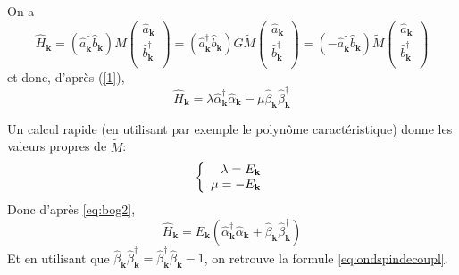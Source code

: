 \documentclass[a4paper, french]{report}
\newcommand{\an}{\hat{a}}
\newcommand{\cre}{\hat{a}^\dagger}
\newcommand{\h}{\ensuremath{\hat{H}}\xspace}
\newcommand{\ban}{\hat{b}}
\newcommand{\bcre}{\hat{b}^\dagger}
\newcommand{\ond}{\ensuremath{\mathbf{k}\xspace}}
\newcommand{\alcre}{\hat{\alpha}^\dagger_{\ond}}
\newcommand{\alan}{\hat{\alpha}_{\ond}}
\newcommand{\betcre}{\hat{\beta}^\dagger_{\ond}}
\newcommand{\betan}{\hat{\beta}_{\ond}}
\newcommand{\1}{\ensuremath{\ket{\om_1\bom_1}}\xspace}
\newcommand{\2}{\ensuremath{\ket{\om_2\bom_2}}\xspace}
\newcommand{\tilm}{\ensuremath{\tilde{M}}\xspace}
\begin{document}
On a
\[
	\h_\ond = \left(\cre_\ond \ban_\ond \right)M
	\begin{pmatrix}
	\an_\ond \\
	\bcre_\ond \\
	\end{pmatrix}
	=
	\left(\cre_\ond \ban_\ond \right)G \tilm
	\begin{pmatrix}
	\an_\ond \\
	\bcre_\ond \\
	\end{pmatrix}
	=
	\left(-\cre_\ond \ban_\ond \right)\tilm
	\begin{pmatrix}
	\an_\ond \\
	\bcre_\ond \\
	\end{pmatrix}
\]
et donc, d'après (\ref{1}),
\begin{equation}
	\label{eq:bog2}
	\h_\ond = \lambda \alcre\alan-\mu\betan\betcre
\end{equation}

Un calcul rapide (en utilisant par exemple le polynôme caractéristique) donne les valeurs propres de \tilm :
\begin{equation}
\left\{
	\begin{array}{r c l}
		\lambda=E_\ond \\
		\mu=-E_\ond
	\end{array}
\right.
\end{equation}
Donc d'après \ref{eq:bog2},
\begin{equation}
	\h_\ond = E_\ond \left(\alcre\alan+\betan\betcre\right)
\end{equation}
Et en utilisant que $\betan\betcre=\betcre\betan-1$, on retrouve la formule \ref{eq:ondspindecoupl}.
\end{document}
